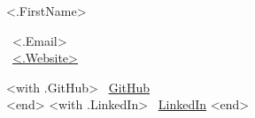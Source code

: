 \begin{minipage}[t][0.8cm][c]{.45\textwidth}
{\centering \fontsize{36pt}{42pt}\selectfont <.FirstName> }
\end{minipage}
\begin{minipage}[t][0.8cm][c]{0.32\textwidth}
{
    \fontsize{14}{18}\selectfont
    \faEnvelope \ <.Email>
    \vspace{6 pt}\\
    \faGlobe \ \href{https://<.Website>}{<.Website>}
}
\end{minipage}
\begin{minipage}[t][0.8cm][c]{0.30\textwidth}
{
    \fontsize{14}{18}\selectfont
    <with .GitHub> \faGithub \ \href{https://github.com/<.>}{GitHub} \vspace{6 pt}\\ <end>
    <with .LinkedIn> \faLinkedin \ \href{https://linkedin.com/in/<.>}{LinkedIn} <end>
}
\end{minipage}
\vspace{6 pt}\\
\noindent\makebox[\linewidth]{\rule{\paperwidth}{0.4pt}}
